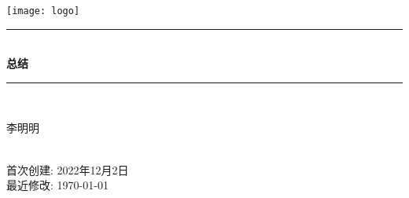 \newcommand{\mytitle}{总结}
\newcommand{\firstcreated}{2022年12月2日}

\begin{titlepage}

\newcommand{\HRule}{\rule{\linewidth}{0.5mm}} %

\center                         %
 

\texttt{[image: logo]}\\[1cm] %


\HRule\\[0.4cm]
{ \huge \bfseries \mytitle}\\[0.4cm] %
\HRule\\[1.5cm]
 

\begin{minipage}{0.4\textwidth}
\begin{center} \large
李明明\\ %
\end{center}

\end{minipage}\\[2cm]


\vfill
{\large 首次创建: \firstcreated}\\
{\large 最近修改: \today}\\[2cm] %



\end{titlepage}


